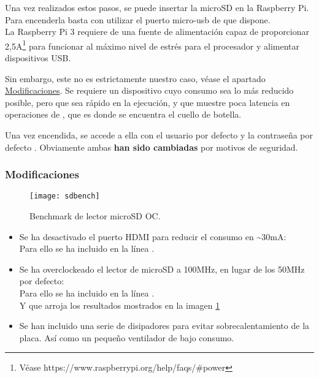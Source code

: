 Una vez realizados estos pasos, se puede insertar la microSD en la Raspberry Pi. Para encenderla basta con utilizar el puerto micro-usb de que dispone.\\La Raspberry Pi 3 requiere de una fuente de alimentación capaz de proporcionar 2,5A\footnote{Véase https://www.raspberrypi.org/help/faqs/\#power} para funcionar al máximo nivel de estrés para el procesador y alimentar dispositivos USB.

Sin embargo, este no es estrictamente nuestro caso, véase el apartado \hyperref[subsec:Modificaciones]{Modificaciones}. Se requiere un dispositivo cuyo consumo sea lo más reducido posible, pero que sea rápido en la ejecución, y que muestre poca latencia en operaciones de , que es donde se encuentra el cuello de botella.

Una vez encendida, se accede a ella con el usuario por defecto  y la contraseña por defecto . Obviamente ambas \textbf{han sido cambiadas} por motivos de seguridad.



\subsubsection{Modificaciones}
\label{subsec:Modificaciones}

\begin{figure}
	\centering
	\texttt{[image: sdbench]}
	\caption{Benchmark de lector microSD OC.}\label{fig:sdbenchmark}
\end{figure}

\begin{itemize}
\item Se ha desactivado el puerto HDMI para reducir el consumo en \textasciitilde{}30mA: \\Para ello se ha incluido en  la línea .
\item Se ha overclockeado el lector de microSD a 100MHz, en lugar de los 50MHz por defecto: \\Para ello se ha incluido en  la línea .\\Y que arroja los resultados mostrados en la imagen \ref{fig:sdbenchmark}
\item Se han incluido una serie de disipadores para evitar sobrecalentamiento de la placa. Así como un pequeño ventilador de bajo consumo.
\end{itemize} 


